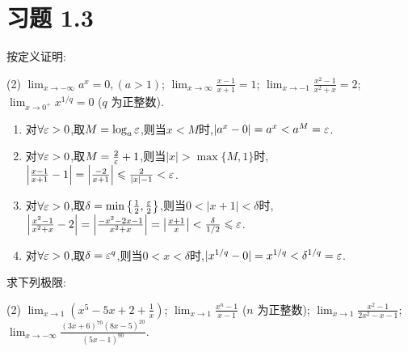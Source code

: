 \section*{习题 1.3}

\begin{exercise}[1.3.1]\label{exe:1.3.1}
    按定义证明:
    \begin{tasks}[label=(\arabic*)](2)
        \task $\lim_{x \to -\infty} a^x = 0, (a > 1)$;
        \task $\lim_{x \to \infty} \frac{x-1}{x+1} = 1$;
        \task $\lim_{x \to -1} \frac{x^2-1}{x^2+x} = 2$;
        \task $\lim_{x \to 0^+} x^{1/q} = 0$ ($q$ 为正整数).
    \end{tasks}
\end{exercise}

\begin{solution}
    \begin{enumerate}[(1)]
        \item 对$\forall \varepsilon > 0$,取$M = \log_a \varepsilon$,则当$x < M$时,$|a^x - 0| = a^x < a^M = \varepsilon$.
        \item 对$\forall \varepsilon > 0$,取$M = \frac{2}{\varepsilon}+1$,则当$|x| > \max\{M,1\}$时,$\left| \frac{x-1}{x+1} - 1 \right| = \left| \frac{-2}{x+1} \right| \leqslant \frac{2}{|x|-1} <  \varepsilon$.
        \item 对$\forall \varepsilon > 0$,取$\delta = \min \left\{ \frac{1}{2}, \frac{\varepsilon}{2} \right\}$,则当$0<|x+1| < \delta$时,$\left| \frac{x^2-1}{x^2+x} - 2 \right| = \left| \frac{-x^2 - 2x - 1}{x^2 + x} \right| = \left| \frac{x+1}{x} \right| < \frac{\delta}{1 / 2} \leqslant  \varepsilon$.
        \item 对$\forall \varepsilon > 0$,取$\delta = \varepsilon^q$,则当$0 < x < \delta$时,$|x^{1/q} - 0| = x^{1/q} < \delta^{1/q} = \varepsilon$.
    \end{enumerate}
\end{solution}

\begin{exercise}[1.3.2]
    求下列极限:
    \begin{tasks}[label=(\arabic*)](2)
        \task $\lim_{x \to 1} \left(x^5 - 5x + 2 + \frac{1}{x}\right)$;
        \task $\lim_{x \to 1} \frac{x^n - 1}{x - 1}$ ($n$ 为正整数);
        \task $\lim_{x \to 1} \frac{x^2-1}{2x^2-x-1}$;
        \task $\lim_{x \to -\infty} \frac{(3x+6)^{70}(8x-5)^{20}}{(5x-1)^{90}}$.
    \end{tasks}
\end{exercise}

